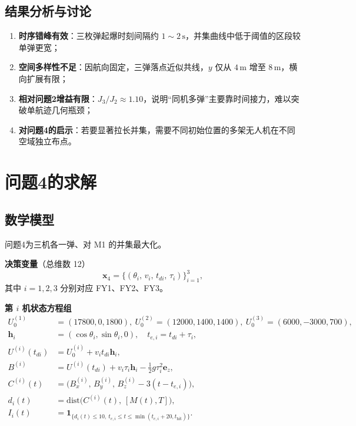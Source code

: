\documentclass[withoutpreface,bwprint]{cumcmthesis}
\begin{document}
\subsection{结果分析与讨论}
\begin{enumerate}
  \item \textbf{时序错峰有效}：三枚弹起爆时刻间隔约 $1\sim2\,\mathrm{s}$，并集曲线中低于阈值的区段较单弹更宽；
  \item \textbf{空间多样性不足}：因航向固定，三弹落点近似共线，$y$ 仅从 $4\,\mathrm{m}$ 增至 $8\,\mathrm{m}$，横向扩展有限；
  \item \textbf{相对问题2增益有限}：$J_3/J_2\approx 1.10$，说明“同机多弹”主要靠时间接力，难以突破单航迹几何瓶颈；
  \item \textbf{对问题4的启示}：若要显著拉长并集，需要不同初始位置的多架无人机在不同空域独立布点。
\end{enumerate}

\section{问题4的求解}
\label{sec:q4}

\subsection{数学模型}
问题4为三机各一弹、对 M1 的并集最大化。

\textbf{决策变量}（总维数 12）
\begin{equation}
\mathbf{x}_4=\big\{
(\theta_i,\,v_i,\,t_{di},\,\tau_i)
\big\}_{i=1}^{3},
\label{eq:q4-var}
\end{equation}
其中 $i=1,2,3$ 分别对应 FY1、FY2、FY3。

\textbf{第 $i$ 机状态方程组}
\begin{equation}
\begin{aligned}
U_0^{(1)}&=(17800,0,1800),\ 
U_0^{(2)}=(12000,1400,1400),\ 
U_0^{(3)}=(6000,-3000,700),\\
\mathbf{h}_i&=(\cos\theta_i,\sin\theta_i,0),\quad
t_{e,i}=t_{di}+\tau_i,\\
U^{(i)}(t_{di})&=U_0^{(i)}+v_i t_{di}\mathbf{h}_i,\\
B^{(i)}&=U^{(i)}(t_{di})+v_i\tau_i\mathbf{h}_i-\tfrac12 g\tau_i^2\mathbf{e}_z,\\
C^{(i)}(t)&=\big(B^{(i)}_x,\,B^{(i)}_y,\,B^{(i)}_z-3(t-t_{e,i})\big),\\
d_i(t)&=\mathrm{dist}\big(C^{(i)}(t),\,[M(t),T]\big),\\
I_i(t)&=\mathbf{1}_{\{
d_i(t)\le 10,\ 
t_{e,i}\le t\le\min(t_{e,i}+20,t_{\mathrm{hit}})
\}}.
\end{aligned}
\label{eq:q4-state}
\end{equation}
\end{document}

